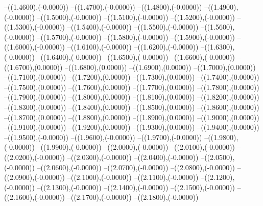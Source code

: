 {	--({\sx*(1.4600)},{\sy*(-0.0000)})
	--({\sx*(1.4700)},{\sy*(-0.0000)})
	--({\sx*(1.4800)},{\sy*(-0.0000)})
	--({\sx*(1.4900)},{\sy*(-0.0000)})
	--({\sx*(1.5000)},{\sy*(-0.0000)})
	--({\sx*(1.5100)},{\sy*(-0.0000)})
	--({\sx*(1.5200)},{\sy*(-0.0000)})
	--({\sx*(1.5300)},{\sy*(-0.0000)})
	--({\sx*(1.5400)},{\sy*(-0.0000)})
	--({\sx*(1.5500)},{\sy*(-0.0000)})
	--({\sx*(1.5600)},{\sy*(-0.0000)})
	--({\sx*(1.5700)},{\sy*(-0.0000)})
	--({\sx*(1.5800)},{\sy*(-0.0000)})
	--({\sx*(1.5900)},{\sy*(-0.0000)})
	--({\sx*(1.6000)},{\sy*(-0.0000)})
	--({\sx*(1.6100)},{\sy*(-0.0000)})
	--({\sx*(1.6200)},{\sy*(-0.0000)})
	--({\sx*(1.6300)},{\sy*(-0.0000)})
	--({\sx*(1.6400)},{\sy*(-0.0000)})
	--({\sx*(1.6500)},{\sy*(-0.0000)})
	--({\sx*(1.6600)},{\sy*(-0.0000)})
	--({\sx*(1.6700)},{\sy*(0.0000)})
	--({\sx*(1.6800)},{\sy*(0.0000)})
	--({\sx*(1.6900)},{\sy*(0.0000)})
	--({\sx*(1.7000)},{\sy*(0.0000)})
	--({\sx*(1.7100)},{\sy*(0.0000)})
	--({\sx*(1.7200)},{\sy*(0.0000)})
	--({\sx*(1.7300)},{\sy*(0.0000)})
	--({\sx*(1.7400)},{\sy*(0.0000)})
	--({\sx*(1.7500)},{\sy*(0.0000)})
	--({\sx*(1.7600)},{\sy*(0.0000)})
	--({\sx*(1.7700)},{\sy*(0.0000)})
	--({\sx*(1.7800)},{\sy*(0.0000)})
	--({\sx*(1.7900)},{\sy*(0.0000)})
	--({\sx*(1.8000)},{\sy*(0.0000)})
	--({\sx*(1.8100)},{\sy*(0.0000)})
	--({\sx*(1.8200)},{\sy*(0.0000)})
	--({\sx*(1.8300)},{\sy*(0.0000)})
	--({\sx*(1.8400)},{\sy*(0.0000)})
	--({\sx*(1.8500)},{\sy*(0.0000)})
	--({\sx*(1.8600)},{\sy*(0.0000)})
	--({\sx*(1.8700)},{\sy*(0.0000)})
	--({\sx*(1.8800)},{\sy*(0.0000)})
	--({\sx*(1.8900)},{\sy*(0.0000)})
	--({\sx*(1.9000)},{\sy*(0.0000)})
	--({\sx*(1.9100)},{\sy*(0.0000)})
	--({\sx*(1.9200)},{\sy*(0.0000)})
	--({\sx*(1.9300)},{\sy*(0.0000)})
	--({\sx*(1.9400)},{\sy*(0.0000)})
	--({\sx*(1.9500)},{\sy*(-0.0000)})
	--({\sx*(1.9600)},{\sy*(-0.0000)})
	--({\sx*(1.9700)},{\sy*(-0.0000)})
	--({\sx*(1.9800)},{\sy*(-0.0000)})
	--({\sx*(1.9900)},{\sy*(-0.0000)})
	--({\sx*(2.0000)},{\sy*(-0.0000)})
	--({\sx*(2.0100)},{\sy*(-0.0000)})
	--({\sx*(2.0200)},{\sy*(-0.0000)})
	--({\sx*(2.0300)},{\sy*(-0.0000)})
	--({\sx*(2.0400)},{\sy*(-0.0000)})
	--({\sx*(2.0500)},{\sy*(-0.0000)})
	--({\sx*(2.0600)},{\sy*(-0.0000)})
	--({\sx*(2.0700)},{\sy*(-0.0000)})
	--({\sx*(2.0800)},{\sy*(-0.0000)})
	--({\sx*(2.0900)},{\sy*(-0.0000)})
	--({\sx*(2.1000)},{\sy*(-0.0000)})
	--({\sx*(2.1100)},{\sy*(-0.0000)})
	--({\sx*(2.1200)},{\sy*(-0.0000)})
	--({\sx*(2.1300)},{\sy*(-0.0000)})
	--({\sx*(2.1400)},{\sy*(-0.0000)})
	--({\sx*(2.1500)},{\sy*(-0.0000)})
	--({\sx*(2.1600)},{\sy*(-0.0000)})
	--({\sx*(2.1700)},{\sy*(-0.0000)})
	--({\sx*(2.1800)},{\sy*(-0.0000)})
}
